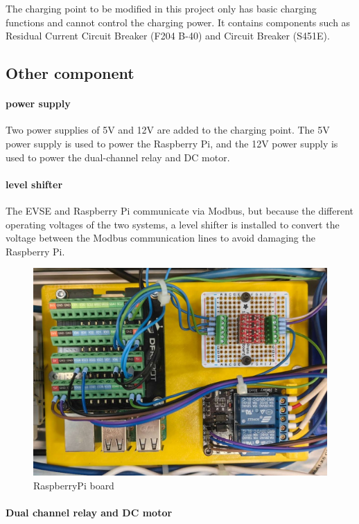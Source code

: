 \documentclass[
english,
ruledheaders=section,%
class=report,%
thesis={type=Report},%
accentcolor=9c,%
custommargins=true,%
marginpar=false,%
parskip=half-,%
fontsize=11pt,%
logofile={img/tuda_logo.pdf}, %
]{tudapub}
\begin{document}
    The charging point to be modified in this project only has basic charging functions and cannot control the charging power. It contains components such as Residual Current Circuit Breaker (F204 B-40) and Circuit Breaker (S451E).
    \subsection{Other component}
    \label{subsec:Other component}
    \paragraph{power supply}

    Two power supplies of 5V and 12V are added to the charging point. The 5V power supply is used to power the Raspberry Pi, and the 12V power supply is used to power the dual-channel relay and DC motor.
    \paragraph{level shifter}

    The EVSE and Raspberry Pi communicate via Modbus, but because the different operating voltages of the two systems, a level shifter is installed to convert the voltage between the Modbus communication lines to avoid damaging the Raspberry Pi.

    \begin{figure}
        \centering
        \includegraphics[width=0.5\linewidth]{img/RaspberryPi board.jpg}
        \caption{RaspberryPi board}
        \label{fig:RaspberryPi board}
    \end{figure}

    \paragraph{Dual channel relay and DC motor}
\end{document}
